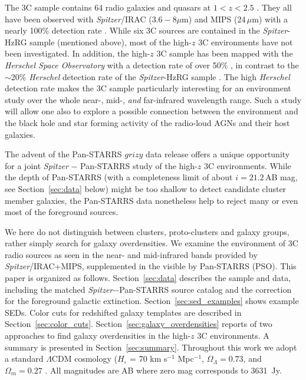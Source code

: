 \documentclass[mathleft,fleqn,%
]{an}
\begin{document}
The 3C sample contains 64 radio galaxies and quasars at $1<z<2.5$ 
\citep{Spinrad85}. They all have been observed with {\it Spitzer}/IRAC 
($3.6-8 \mu$m) and MIPS (24\,$\mu$m) with a nearly 100\% detection
rate \citep{Podigachoski15}. 
While six 3C sources are contained in the {\it Spitzer}-HzRG sample
(mentioned above),  
most of the high-$z$ 3C environments have not been investigated.
In addition, the high-$z$ 3C sample has been mapped with the {\it Herschel
Space Observatory} with a detection rate of over 50\%  \citep{Podigachoski15}, in contrast to
the $\sim$20\% {\it Herschel} detection rate of the {\it Spitzer}-HzRG sample
\citep{Drouart14}. 
The high {\it Herschel} detection rate makes the 3C sample particularly 
interesting for an environment
study over the whole near-, mid-, {\it and} far-infrared wavelength range.
Such a study will allow one also to explore a possible connection between the
environment and the black hole and star forming activity of the
radio-loud AGNs and their host galaxies.

The advent of the Pan-STARRS $grizy$ data release 
\citep{Chambers16, Magnier16} offers a unique opportunity
for a joint {\it Spitzer} $-$ Pan-STARRS study of the high-$z$ 3C environments.
While the depth of Pan-STARRS (with a completeness limit of about $i =
21.2$\,AB mag, see Section~\ref{sec:data} below)  
might be too shallow to
detect candidate cluster member galaxies, the Pan-STARRS data
nonetheless help to reject many or even most of the foreground sources.

We here do not distinguish between
clusters, proto-clusters and galaxy groups, rather simply search for galaxy overdensities.
We examine the environment of 3C radio sources as seen in the near- and
mid-infrared bands provided by {\it Spitzer}/IRAC+MIPS, supplemented in the
visible by Pan-STARRS (PSO).
This paper is organized as follows.  Section~\ref{sec:data} 
describes the sample and data, including 
the matched {\it Spitzer}$-$Pan-STARRS
source catalog and the correction for the foreground galactic extinction.
Section~\ref{sec:sed_examples} shows example SEDs.
Color cuts for redshifted galaxy templates are described in
Section~\ref{sec:color_cuts}. Section~\ref{sec:galaxy_overdensities}
reports of two approaches to find galaxy overdensities in the high-$z$ 
3C environments. 
A summary is presented in Section~\ref{sec:summary}.
Throughout this work we adopt a standard $\Lambda$CDM cosmology
($H_\circ$ = 70 km s$^{-1}$ 
Mpc$^{-1}$, $\Omega_\Lambda = 0.73$, and $\Omega_m = 0.27$ \citep{Spergel07}. All
magnitudes are AB where zero mag corresponds to 3631~Jy. 
\end{document}
